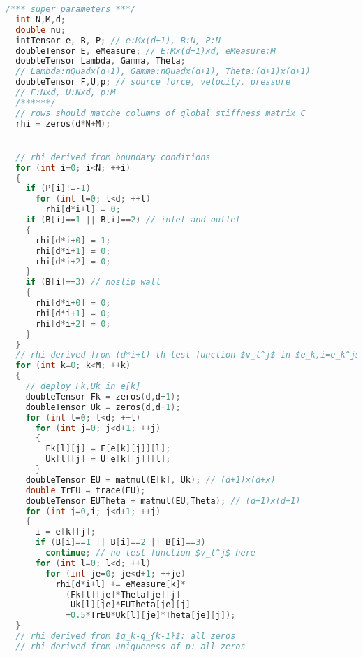 \begin{lstlisting}[caption=RightHandItems,
language=C++,keywordstyle=\color{blue},commentstyle=\color{red!80!green!80!blue!80},frame=lines,
rulesepcolor=\color{red!50!green!50!blue!50},tabsize=2,mathescape=true]
  /*** super parameters ***/
  int N,M,d; 
  double nu;
  intTensor e, B, P; // e:Mx(d+1), B:N, P:N
  doubleTensor E, eMeasure; // E:Mx(d+1)xd, eMeasure:M
  doubleTensor Lambda, Gamma, Theta; 
  // Lambda:nQuadx(d+1), Gamma:nQuadx(d+1), Theta:(d+1)x(d+1)
  doubleTensor F,U,p; // source force, velocity, pressure
  // F:Nxd, U:Nxd, p:M
  /******/
  // rows should matche columns of global stiffness matrix C
  rhi = zeros(d*N+M);


  // rhi derived from boundary conditions
  for (int i=0; i<N; ++i)
  {
    if (P[i]!=-1)
      for (int l=0; l<d; ++l)
        rhi[d*i+l] = 0;
    if (B[i]==1 || B[i]==2) // inlet and outlet
    {
      rhi[d*i+0] = 1;
      rhi[d*i+1] = 0;
      rhi[d*i+2] = 0;
    }
    if (B[i]==3) // noslip wall
    {
      rhi[d*i+0] = 0;
      rhi[d*i+1] = 0;
      rhi[d*i+2] = 0;
    }
  }
  // rhi derived from (d*i+l)-th test function $v_l^j$ in $e_k,i=e_k^j$
  for (int k=0; k<M; ++k)
  {
    // deploy Fk,Uk in e[k]
    doubleTensor Fk = zeros(d,d+1);
    doubleTensor Uk = zeros(d,d+1);
    for (int l=0; l<d; ++l)
      for (int j=0; j<d+1; ++j)
      {
        Fk[l][j] = F[e[k][j]][l];
        Uk[l][j] = U[e[k][j]][l];
      }
    doubleTensor EU = matmul(E[k], Uk); // (d+1)x(d+x)
    double TrEU = trace(EU);
    doubleTensor EUTheta = matmul(EU,Theta); // (d+1)x(d+1)
    for (int j=0,i; j<d+1; ++j)
    {
      i = e[k][j];
      if (B[i]==1 || B[i]==2 || B[i]==3)
        continue; // no test function $v_l^j$ here
      for (int l=0; l<d; ++l)
        for (int je=0; je<d+1; ++je)
          rhi[d*i+l] += eMeasure[k]*
            (Fk[l][je]*Theta[je][j]
            -Uk[l][je]*EUTheta[je][j]
            +0.5*TrEU*Uk[l][je]*Theta[je][j]);
  }
  // rhi derived from $q_k-q_{k-1}$: all zeros
  // rhi derived from uniqueness of p: all zeros
\end{lstlisting}

